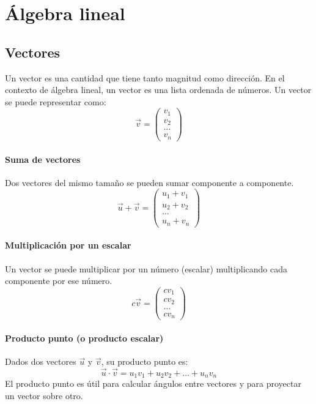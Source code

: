 \section{Álgebra lineal}
\subsection{Vectores}
Un vector es una cantidad que tiene tanto magnitud como dirección. En el contexto de álgebra lineal, un vector es una lista ordenada de números.
Un vector se puede representar como:
$$\vec{v} = \begin{pmatrix}
v_1 \\ v_2 \\ \ldots \\ v_n
\end{pmatrix}$$

\paragraph{Suma de vectores} Dos vectores del mismo tamaño se pueden sumar componente a componente.
$$\vec{u} + \vec{v} = \begin{pmatrix}
u_1 + v_1 \\ u_2 + v_2 \\ \ldots \\ u_n + v_n
\end{pmatrix}$$

\paragraph{Multiplicación por un escalar} Un vector se puede multiplicar por un número (escalar) multiplicando cada componente por ese número.
$$c\vec{v} = \begin{pmatrix}
cv_1 \\ cv_2 \\ \ldots \\ cv_n
\end{pmatrix}$$

\paragraph{Producto punto (o producto escalar)} Dados dos vectores $\vec{u}$ y $\vec{v}$, su producto punto es:
$$\vec{u} \cdot \vec{v} = u_1v_1 + u_2v_2 + \ldots + u_nv_n$$
El producto punto es útil para calcular ángulos entre vectores y para proyectar un vector sobre otro.

